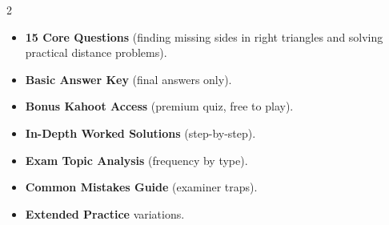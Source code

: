 \documentclass[11pt,a4paper]{article}
\newcommand{\FullReleaseDate}{April 30, 2026}
\begin{document}
\vspace{8pt}

\begin{multicols}{2}
  \begin{tcolorbox}[card, title=\sffamily\bfseries\textcolor{white}{\faHandPointDown\ TODAY (Simplified Version)}, colbacktitle=mainblue, boxed title style={sharp corners, boxrule=0pt}]
    \begin{itemize}[leftmargin=1.2em, itemsep=2pt]
      \item \small \textbf{15 Core Questions} (finding missing sides in right triangles and solving practical distance problems).
      \item \small \textbf{Basic Answer Key} (final answers only).
      \item \small \textbf{Bonus Kahoot Access} (premium quiz, free to play).
    \end{itemize}
  \end{tcolorbox}

  \columnbreak

  \begin{tcolorbox}[card, title=\sffamily\bfseries\textcolor{white}{\faRocket\ ON \FullReleaseDate\ (Full Upgrade)}, colbacktitle=mainblue, boxed title style={sharp corners, boxrule=0pt}]
    \begin{itemize}[leftmargin=1.2em, itemsep=2pt]
      \item \small \textbf{In-Depth Worked Solutions} (step-by-step).
      \item \small \textbf{Exam Topic Analysis} (frequency by type).
      \item \small \textbf{Common Mistakes Guide} (examiner traps).
      \item \small \textbf{Extended Practice} variations.
    \end{itemize}
  \end{tcolorbox}
\end{multicols}
\end{document}
